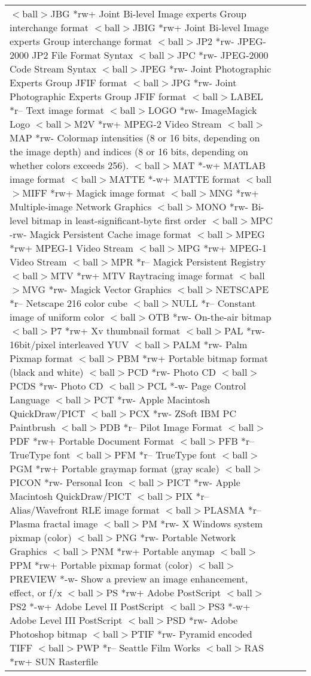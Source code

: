 \begin{longtable}{llll}
$<$ball$>$JBG	*rw+	Joint Bi-level Image experts Group
		interchange format
$<$ball$>$JBIG	*rw+	Joint Bi-level Image experts Group
		interchange format
$<$ball$>$JP2	*rw-	JPEG-2000 JP2 File Format Syntax
$<$ball$>$JPC	*rw-	JPEG-2000 Code Stream Syntax
$<$ball$>$JPEG	*rw-	Joint Photographic Experts Group
		JFIF format
$<$ball$>$JPG	*rw-	Joint Photographic Experts Group
		JFIF format
$<$ball$>$LABEL	*r--	Text image format
$<$ball$>$LOGO	*rw-	ImageMagick Logo
$<$ball$>$M2V	*rw+	MPEG-2 Video Stream
$<$ball$>$MAP	*rw-	Colormap intensities (8 or 16 bits,
		depending on the image depth) and
		indices (8 or 16 bits, depending
 	 	on whether colors exceeds 256).
$<$ball$>$MAT	*-w+	MATLAB image format
$<$ball$>$MATTE	*-w+	MATTE format
$<$ball$>$MIFF	*rw+	Magick image format
$<$ball$>$MNG	*rw+	Multiple-image Network Graphics
$<$ball$>$MONO	*rw-	Bi-level bitmap in least-significant-byte
		first order
$<$ball$>$MPC	-rw-	Magick Persistent Cache image format
$<$ball$>$MPEG	*rw+	MPEG-1 Video Stream
$<$ball$>$MPG	*rw+	MPEG-1 Video Stream
$<$ball$>$MPR	*r--	Magick Persistent Registry
$<$ball$>$MTV	*rw+	MTV Raytracing image format
$<$ball$>$MVG	*rw-	Magick Vector Graphics
$<$ball$>$NETSCAPE	*r--	Netscape 216 color cube
$<$ball$>$NULL	*r--	Constant image of uniform color
$<$ball$>$OTB	*rw-	On-the-air bitmap
$<$ball$>$P7	*rw+	Xv thumbnail format
$<$ball$>$PAL	*rw-	16bit/pixel interleaved YUV
$<$ball$>$PALM	*rw-	Palm Pixmap format
$<$ball$>$PBM	*rw+	Portable bitmap format (black and white)
$<$ball$>$PCD	*rw-	Photo CD
$<$ball$>$PCDS	*rw-	Photo CD
$<$ball$>$PCL	*-w-	Page Control Language
$<$ball$>$PCT	*rw-	Apple Macintosh QuickDraw/PICT
$<$ball$>$PCX	*rw-	ZSoft IBM PC Paintbrush
$<$ball$>$PDB	*r--	Pilot Image Format
$<$ball$>$PDF	*rw+	Portable Document Format
$<$ball$>$PFB	*r--	TrueType font
$<$ball$>$PFM	*r--	TrueType font
$<$ball$>$PGM	*rw+	Portable graymap format (gray scale)
$<$ball$>$PICON	*rw-	Personal Icon
$<$ball$>$PICT	*rw-	Apple Macintosh QuickDraw/PICT
$<$ball$>$PIX	*r--	Alias/Wavefront RLE image format
$<$ball$>$PLASMA	*r--	Plasma fractal image
$<$ball$>$PM	*rw-	X Windows system pixmap (color)
$<$ball$>$PNG	*rw-	Portable Network Graphics
$<$ball$>$PNM	*rw+	Portable anymap
$<$ball$>$PPM	*rw+	Portable pixmap format (color)
$<$ball$>$PREVIEW	*-w-	Show a preview an image enhancement,
		effect, or f/x
$<$ball$>$PS	*rw+	Adobe PostScript
$<$ball$>$PS2	*-w+	Adobe Level II PostScript
$<$ball$>$PS3	*-w+	Adobe Level III PostScript
$<$ball$>$PSD	*rw-	Adobe Photoshop bitmap
$<$ball$>$PTIF	*rw-	Pyramid encoded TIFF
$<$ball$>$PWP	*r--	Seattle Film Works
$<$ball$>$RAS	*rw+	SUN Rasterfile

\end{longtable}
